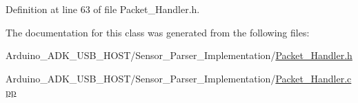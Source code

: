 Definition at line 63 of file Packet\-\_\-\-Handler.\-h.



The documentation for this class was generated from the following files\-:\begin{DoxyCompactItemize}
\item 
Arduino\-\_\-\-A\-D\-K\-\_\-\-U\-S\-B\-\_\-\-H\-O\-S\-T/\-Sensor\-\_\-\-Parser\-\_\-\-Implementation/\hyperlink{_packet___handler_8h}{Packet\-\_\-\-Handler.\-h}\item 
Arduino\-\_\-\-A\-D\-K\-\_\-\-U\-S\-B\-\_\-\-H\-O\-S\-T/\-Sensor\-\_\-\-Parser\-\_\-\-Implementation/\hyperlink{_packet___handler_8cpp}{Packet\-\_\-\-Handler.\-cpp}\end{DoxyCompactItemize}
